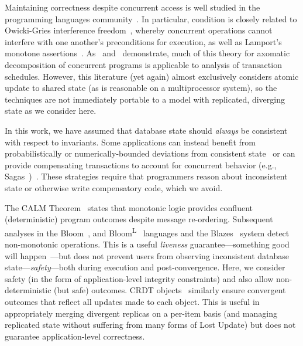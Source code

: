  Maintaining correctness despite concurrent
access is well studied in the programming languages
community~\cite{schneider-concurrent}. In particular, \iconfluence
condition is closely related to Owicki-Gries interference
freedom~\cite{owickigries}, whereby concurrent operations cannot
interfere with one another's preconditions for execution, as well as
Lamport's monotone
assertions~\cite{lamport-safety}. As~\cite{decomp-semantics}
and~\cite{agarwal-consistency} demonstrate, much of this theory for
axomatic decomposition of concurrent programs is applicable to
analysis of transaction schedules. However, this literature (yet
again) almost exclusively considers atomic update to shared state (as
is reasonable on a multiprocessor system), so the techniques are not
immediately portable to a model with replicated, diverging state as we
consider here.

 In this work, we have assumed that
database state should \textit{always} be consistent with respect to
invariants. Some applications can instead benefit from
probabilistically or numerically-bounded deviations from consistent
state~\cite{epsilon-divergence} or can provide compensating
transactions to account for concurrent behavior (e.g.,
Sagas~\cite{sagas})~\cite{ic-survey,ic-survey-two}. These strategies
require that programmers reason about inconsistent state or otherwise
write compensatory code, which we avoid.

 The CALM
Theorem~\cite{ameloot-calm} states that monotonic logic provides
confluent (deterministic) program outcomes despite message
re-ordering. Subsequent analyses in the Bloom~\cite{calm}, and
Bloom\textsuperscript{L}~\cite{blooml} languages and the
Blazes~\cite{blazes} system detect non-monotonic operations. This is a
useful \textit{liveness} guarantee---something good will
happen~\cite{lamport-safety}---but does not prevent users from
observing inconsistent database state---\textit{safety}---both during
execution and post-convergence. Here, we consider safety (in the form
of application-level integrity constraints) and also allow
non-deterministic (but safe) outcomes. CRDT objects~\cite{crdt}
similarly ensure convergent outcomes that reflect all updates made to
each object. This is useful in appropriately merging divergent
replicas on a per-item basis (and managing replicated state without
suffering from many forms of Lost Update) but does not guarantee
application-level correctness.

